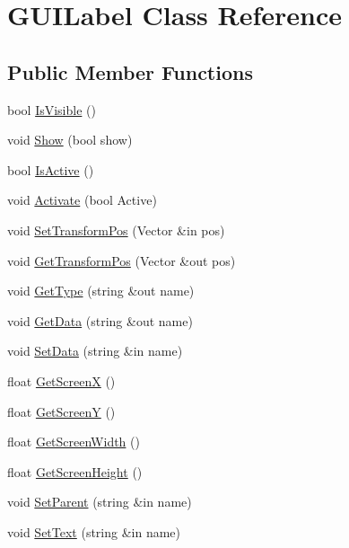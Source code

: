 \hypertarget{class_g_u_i_label}{}\section{G\+U\+I\+Label Class Reference}
\label{class_g_u_i_label}
\subsection*{Public Member Functions}
\begin{DoxyCompactItemize}
\item 
bool \hyperlink{class_g_u_i_label_ae66dc36d94c5a4aee59ff6ae3fe96951}{Is\+Visible} ()
\item 
void \hyperlink{class_g_u_i_label_a5a70d1509e3e1ddec286c154bf2cc2d3}{Show} (bool show)
\item 
bool \hyperlink{class_g_u_i_label_a5bde8f8930ba45e5fdc916ebd81b6d9d}{Is\+Active} ()
\item 
void \hyperlink{class_g_u_i_label_a03e5eebc66c5e662535f92cc3778b5aa}{Activate} (bool Active)
\item 
void \hyperlink{class_g_u_i_label_ab630591bc354b44170a7c1e65d3b47bc}{Set\+Transform\+Pos} (Vector \&in pos)
\item 
void \hyperlink{class_g_u_i_label_a5ad13a72ed2bb5497ffee3929adf729f}{Get\+Transform\+Pos} (Vector \&out pos)
\item 
void \hyperlink{class_g_u_i_label_a2ab9799d33d6ce75584438afe73b181a}{Get\+Type} (string \&out name)
\item 
void \hyperlink{class_g_u_i_label_aeb42efa58eefc6933b83d694ef5ceaf8}{Get\+Data} (string \&out name)
\item 
void \hyperlink{class_g_u_i_label_a91c5449f9dbc88eed31fdf21c002b6c4}{Set\+Data} (string \&in name)
\item 
float \hyperlink{class_g_u_i_label_ae49955db7b6272e3d8b3828d56ee9efc}{Get\+ScreenX} ()
\item 
float \hyperlink{class_g_u_i_label_aec3e610535f22d651adff0502e7013db}{Get\+ScreenY} ()
\item 
float \hyperlink{class_g_u_i_label_a6ae950f739faaa5110e6c14b4e90329b}{Get\+Screen\+Width} ()
\item 
float \hyperlink{class_g_u_i_label_a30ba822a24189efa664fcaaf732f8b3c}{Get\+Screen\+Height} ()
\item 
void \hyperlink{class_g_u_i_label_a40ab78494b4fd8826b65da3dd1ee1efa}{Set\+Parent} (string \&in name)
\item 
void \hyperlink{class_g_u_i_label_a8017096ee8d48e27cb2f86a6415454af}{Set\+Text} (string \&in name)

\end{DoxyCompactItemize}
